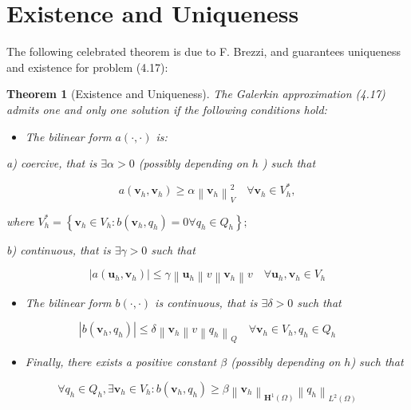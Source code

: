 \documentclass[11pt]{book}
\newtheorem{theorem}{Theorem}
\begin{document}
\section{Existence and Uniqueness}
The following celebrated theorem is due to F. Brezzi, and guarantees uniqueness and existence for problem (4.17):
\begin{theorem}[Existence and Uniqueness]
    
The Galerkin approximation (4.17) admits one and only one solution if the following conditions hold:

\begin{itemize}
  \item The bilinear form $a(\cdot, \cdot)$ is:
\end{itemize}

a) coercive, that is $\exists \alpha>0$ (possibly depending on $h$ ) such that

$$
a\left(\mathbf{v}_{h}, \mathbf{v}_{h}\right) \geq \alpha\left\|\mathbf{v}_{h}\right\|_{V}^{2} \quad \forall \mathbf{v}_{h} \in V_{h}^{*},
$$

where $V_{h}^{*}=\left\{\mathbf{v}_{h} \in V_{h}: b\left(\mathbf{v}_{h}, q_{h}\right)=0 \forall q_{h} \in Q_{h}\right\} ;$

b) continuous, that is $\exists \gamma>0$ such that

$$
\left|a\left(\mathbf{u}_{h}, \mathbf{v}_{h}\right)\right| \leq \gamma\left\|\mathbf{u}_{h}\right\| v\left\|\mathbf{v}_{h}\right\| v \quad \forall \mathbf{u}_{h}, \mathbf{v}_{h} \in V_{h}
$$

\begin{itemize}
  \item The bilinear form $b(\cdot, \cdot)$ is continuous, that is $\exists \delta>0$ such that
\end{itemize}

$$
\left|b\left(\mathbf{v}_{h}, q_{h}\right)\right| \leq \delta\left\|\mathbf{v}_{h}\right\| v\left\|q_{h}\right\|_{Q} \quad \forall \mathbf{v}_{h} \in V_{h}, q_{h} \in Q_{h}
$$

\begin{itemize}
  \item Finally, there exists a positive constant $\beta$ (possibly depending on $h$) such that
\end{itemize}

$$
\forall q_{h} \in Q_{h}, \exists \mathbf{v}_{h} \in V_{h}: b\left(\mathbf{v}_{h}, q_{h}\right) \geq \beta\left\|\mathbf{v}_{h}\right\|_{\mathbf{H}^{1}(\Omega)}\left\|q_{h}\right\|_{L^{2}(\Omega)}
$$


\end{theorem}
\end{document}
